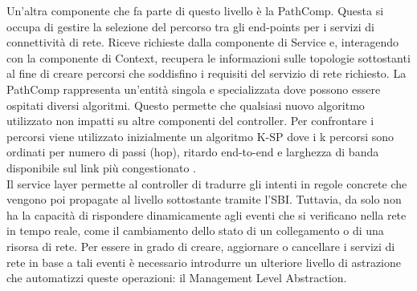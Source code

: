 Un'altra componente che fa parte di questo livello è la PathComp. Questa si occupa di gestire la selezione del percorso tra gli end-points per i servizi di connettività di rete. 
Riceve richieste dalla componente di Service e, interagendo con la componente di Context, recupera le informazioni sulle topologie sottostanti al fine di creare
percorsi che soddisfino i requisiti del servizio di rete richiesto.
La PathComp rappresenta un'entità singola e specializzata dove possono essere ospitati diversi algoritmi. Questo permette che qualsiasi nuovo algoritmo utilizzato non impatti su altre componenti del controller.
Per confrontare i percorsi viene utilizzato inizialmente un algoritmo K-SP dove i k percorsi sono ordinati per numero di passi (hop), ritardo end-to-end e larghezza di banda disponibile sul link più congestionato \cite{D53}. 
\\Il service layer permette al controller di tradurre gli intenti in regole concrete che vengono poi propagate al livello sottostante tramite l'SBI.
Tuttavia, da solo non ha la capacità di rispondere dinamicamente agli eventi che si verificano nella rete in tempo reale, come il cambiamento dello stato di un collegamento o di una risorsa di rete. %
Per essere in grado di creare, aggiornare o cancellare i servizi di rete in base a tali eventi è necessario introdurre un ulteriore livello di astrazione che automatizzi queste operazioni: il Management Level Abstraction.


